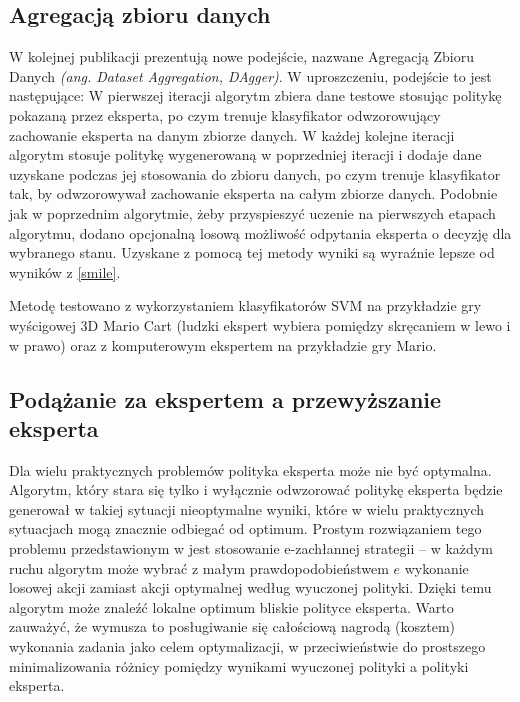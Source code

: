 \subsection{Agregacją zbioru danych}
W kolejnej publikacji \cite{DBLP:journals/corr/abs-1011-0686} prezentują nowe podejście, nazwane Agregacją Zbioru Danych \textit{(ang. Dataset Aggregation, DAgger)}. W uproszczeniu, podejście to jest następujące: W pierwszej iteracji algorytm zbiera dane testowe stosując politykę pokazaną przez eksperta, po czym trenuje klasyfikator odwzorowujący zachowanie eksperta na danym zbiorze danych. W każdej kolejne iteracji algorytm stosuje politykę wygenerowaną w poprzedniej iteracji i dodaje dane uzyskane podczas jej stosowania do zbioru danych, po czym trenuje klasyfikator tak, by odwzorowywał zachowanie eksperta na całym zbiorze danych. Podobnie jak w poprzednim algorytmie, żeby przyspieszyć uczenie na pierwszych etapach algorytmu, dodano opcjonalną losową możliwość odpytania eksperta o decyzję dla wybranego stanu. Uzyskane z pomocą tej metody wyniki są wyraźnie lepsze od wyników z \ref{smile}.

Metodę testowano z wykorzystaniem klasyfikatorów SVM na przykładzie gry wyścigowej 3D Mario Cart (ludzki ekspert wybiera pomiędzy skręcaniem w lewo i w prawo) oraz z komputerowym ekspertem na przykładzie gry Mario.

\subsection{Podążanie za ekspertem a przewyższanie eksperta}
Dla wielu praktycznych problemów polityka eksperta może nie być optymalna. Algorytm, który stara się tylko i wyłącznie odwzorować politykę eksperta będzie generował w takiej sytuacji nieoptymalne wyniki, które w wielu praktycznych sytuacjach mogą znacznie odbiegać od optimum. Prostym rozwiązaniem tego problemu przedstawionym w \cite{DBLP:journals/corr/ChangKADL15} jest stosowanie e-zachłannej strategii – w każdym ruchu algorytm może wybrać z małym prawdopodobieństwem $e$ wykonanie losowej akcji zamiast akcji optymalnej według wyuczonej polityki. Dzięki temu algorytm może znaleźć lokalne optimum bliskie polityce eksperta. Warto zauważyć, że wymusza to posługiwanie się całościową nagrodą (kosztem) wykonania zadania jako celem optymalizacji, w przeciwieństwie do prostszego minimalizowania różnicy pomiędzy wynikami wyuczonej polityki a polityki eksperta.
